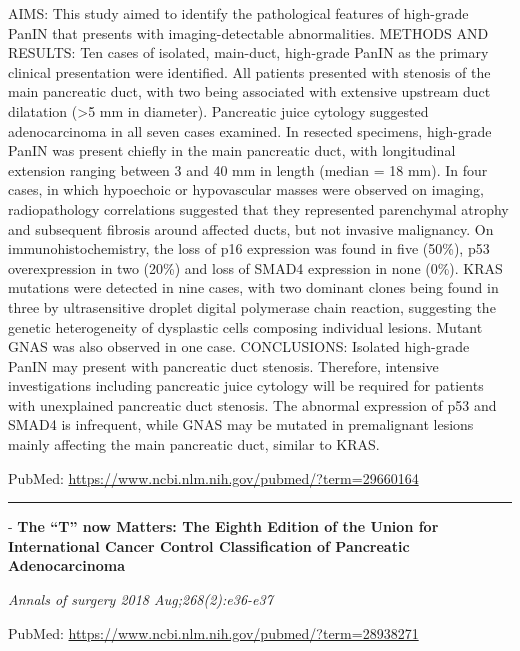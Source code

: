 \documentclass[]{article}
\begin{document}
AIMS: This study aimed to identify the pathological features of
high-grade PanIN that presents with imaging-detectable abnormalities.
METHODS AND RESULTS: Ten cases of isolated, main-duct, high-grade PanIN
as the primary clinical presentation were identified. All patients
presented with stenosis of the main pancreatic duct, with two being
associated with extensive upstream duct dilatation (\textgreater{}5 mm
in diameter). Pancreatic juice cytology suggested adenocarcinoma in all
seven cases examined. In resected specimens, high-grade PanIN was
present chiefly in the main pancreatic duct, with longitudinal extension
ranging between 3 and 40 mm in length (median = 18 mm). In four cases,
in which hypoechoic or hypovascular masses were observed on imaging,
radiopathology correlations suggested that they represented parenchymal
atrophy and subsequent fibrosis around affected ducts, but not invasive
malignancy. On immunohistochemistry, the loss of p16 expression was
found in five (50\%), p53 overexpression in two (20\%) and loss of SMAD4
expression in none (0\%). KRAS mutations were detected in nine cases,
with two dominant clones being found in three by ultrasensitive droplet
digital polymerase chain reaction, suggesting the genetic heterogeneity
of dysplastic cells composing individual lesions. Mutant GNAS was also
observed in one case. CONCLUSIONS: Isolated high-grade PanIN may present
with pancreatic duct stenosis. Therefore, intensive investigations
including pancreatic juice cytology will be required for patients with
unexplained pancreatic duct stenosis. The abnormal expression of p53 and
SMAD4 is infrequent, while GNAS may be mutated in premalignant lesions
mainly affecting the main pancreatic duct, similar to KRAS.

PubMed: \url{https://www.ncbi.nlm.nih.gov/pubmed/?term=29660164}

{}

{}

\begin{center}\rule{0.5\linewidth}{\linethickness}\end{center}

 - \textbf{The ``T'' now Matters: The Eighth Edition of the Union for
International Cancer Control Classification of Pancreatic
Adenocarcinoma}

\emph{Annals of surgery 2018 Aug;268(2):e36-e37}

PubMed: \url{https://www.ncbi.nlm.nih.gov/pubmed/?term=28938271}

{}

{}
\end{document}
